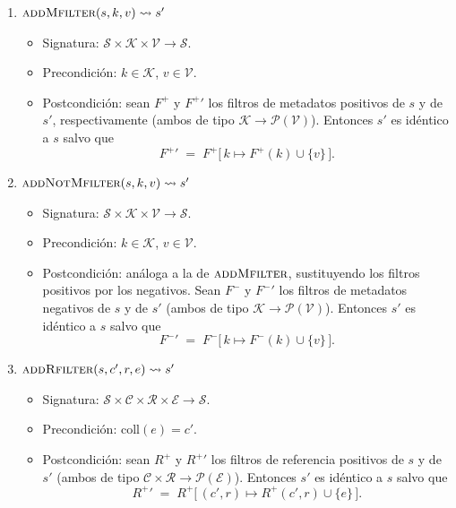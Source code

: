 \begin{enumerate}
  \item $\textsc{addMfilter}(s, k, v) \rightsquigarrow s'$
    \begin{itemize}
      \item Signatura: $\mathcal{S} \times \mathcal{K} \times \mathcal{V} \to \mathcal{S}$.
      \item Precondición: $k \in \mathcal{K}$, $v \in \mathcal{V}$.
      \item Postcondición: sean $F^{+}$ y $F^{+}{}'$ los filtros de metadatos positivos de $s$ y de $s'$,
        respectivamente (ambos de tipo $\mathcal{K} \to \mathcal{P}(\mathcal{V})$). Entonces $s'$ es idéntico
        a $s$ salvo que
        \[
          F^{+}{}' \;=\; F^{+}\bigl[\,k \mapsto F^{+}(k) \cup \{v\}\,\bigr].
        \]
    \end{itemize}

  \item $\textsc{addNotMfilter}(s, k, v) \rightsquigarrow s'$
    \begin{itemize}
      \item Signatura: $\mathcal{S} \times \mathcal{K} \times \mathcal{V} \to \mathcal{S}$.
      \item Precondición: $k \in \mathcal{K}$, $v \in \mathcal{V}$.
      \item Postcondición: análoga a la de $\textsc{addMfilter}$, sustituyendo los filtros positivos por los
        negativos. Sean $F^{-}$ y $F^{-}{}'$ los filtros de metadatos negativos de $s$ y de $s'$
        (ambos de tipo $\mathcal{K} \to \mathcal{P}(\mathcal{V})$). Entonces $s'$ es idéntico a $s$ salvo que
        \[
          F^{-}{}' \;=\; F^{-}\bigl[\,k \mapsto F^{-}(k) \cup \{v\}\,\bigr].
        \]
    \end{itemize}

  \item $\textsc{addRfilter}(s, c', r, e) \rightsquigarrow s'$
    \begin{itemize}
      \item Signatura: $\mathcal{S} \times \mathcal{C} \times \mathcal{R} \times \mathcal{E} \to \mathcal{S}$.
      \item Precondición: $\mathrm{coll}(e) = c'$.
      \item Postcondición: sean $R^{+}$ y $R^{+}{}'$ los filtros de referencia positivos de $s$ y de $s'$
        (ambos de tipo $\mathcal{C} \times \mathcal{R} \to \mathcal{P}(\mathcal{E})$). Entonces $s'$ es
        idéntico a $s$ salvo que
        \[
          R^{+}{}' \;=\; R^{+}\bigl[\,(c', r) \mapsto R^{+}(c', r) \cup \{e\}\,\bigr].
        \]
    \end{itemize}


\end{enumerate}
